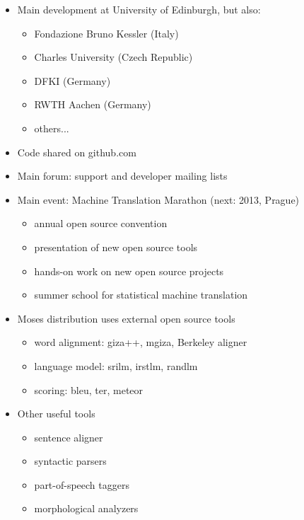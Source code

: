 \documentclass[landscape]{uedslides2C}
\begin{document}
\begin{itemize} \itemsep -1mm
\item Main development at University of Edinburgh, but also: \vspace{-3mm}
\begin{itemize}
\item Fondazione Bruno Kessler (Italy)
\item Charles University (Czech Republic)
\item DFKI (Germany)
\item RWTH Aachen (Germany)
\item others...
\end{itemize}
\item Code shared on github.com
\item Main forum: support and developer mailing lists
\item Main event: Machine Translation Marathon (next: 2013, Prague)\vspace{-3mm}
\begin{itemize}
\item annual open source convention
\item presentation of new open source tools
\item hands-on work on new open source projects
\item summer school for statistical machine translation
\end{itemize}
\end{itemize}


\vspace{10mm}
\begin{itemize}
\item Moses distribution uses external open source tools
\begin{itemize}
\item word alignment: {\sc giza++}, {\sc mgiza}, Berkeley aligner
\item language model: {\sc srilm}, {\sc irstlm}, {\sc randlm}
\item scoring: {\sc bleu}, {\sc ter}, {\sc meteor}
\end{itemize}
\item Other useful tools
\begin{itemize}
\item sentence aligner
\item syntactic parsers
\item part-of-speech taggers
\item morphological analyzers
\end{itemize}
\end{itemize}
\end{document}
